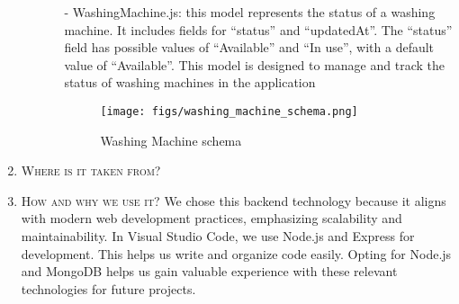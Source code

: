 \documentclass[conference]{IEEEtran}
\begin{document}
\begin{enumerate}
\begin{enumerate}
\begin{itemize}
            \item[-] WashingMachine.js: this model represents the status of a washing machine. It includes fields for “status” and “updatedAt”. The “status” field has possible values of “Available” and “In use”, with a default value of “Available”. This model is designed to manage and track the status of washing machines in the application
            \begin{figure}[H]
            \centering
            \texttt{[image: figs/washing\_machine\_schema.png]}
            \caption{Washing Machine schema}
            \label{fig:Washing Machine Schema}
            \end{figure}
        \end{itemize}

        
    \end{enumerate}

    \item \textsc{Where is it taken from?}

    \item \textsc{How and why we use it?} We chose this backend technology because it aligns with modern web development practices, emphasizing scalability and maintainability. In Visual Studio Code, we use Node.js and Express for development. This helps us write and organize code easily. Opting for Node.js and MongoDB helps us gain valuable experience with these relevant technologies for future projects.
\end{enumerate}
\end{document}
